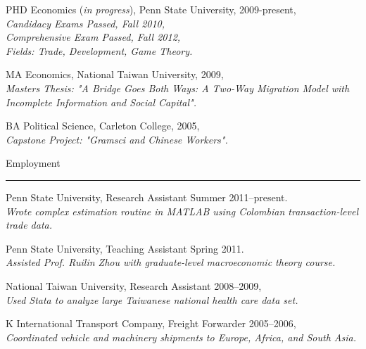 \documentclass[letterpaper]{article}
\renewenvironment{itemize}{
  \begin{list}{}{
    \setlength{\leftmargin}{1.5em}
  }
}{
  \end{list}
}
\begin{document}
\begin{itemize}
  \item PHD Economics (\emph{in progress}), Penn State University, 2009-present,\\
	\hspace*{1cm}\emph{Candidacy Exams Passed, Fall 2010,}\\
  \hspace*{1cm}\emph{Comprehensive Exam Passed, Fall 2012,}\\
	\hspace*{1cm}\emph{Fields: Trade, Development, Game Theory.}
	

  \item MA Economics, National Taiwan University, 2009,\\
	\hspace*{1cm}\emph{Masters Thesis: "A Bridge Goes Both Ways: A Two-Way Migration Model with Incomplete Information \hspace*{1cm}and Social Capital".}

  \item BA Political Science, Carleton College, 2005,\\
	\hspace*{1cm}\emph{Capstone Project: "Gramsci and Chinese Workers".}
\end{itemize}

\vspace{4mm}
{\Large Employment}
 \hrule

\begin{itemize}
\item Penn State University, Research Assistant Summer 2011--present.\\
      \hspace*{1cm}\emph{Wrote complex estimation routine in MATLAB using Colombian transaction-level trade data.}
\item Penn State University, Teaching Assistant Spring 2011.\\
      \hspace*{1cm}\emph{Assisted Prof. Ruilin Zhou with graduate-level macroeconomic theory course.}
\item National Taiwan University, Research Assistant 2008--2009,\\
	\hspace*{1cm}\emph{Used Stata to analyze large Taiwanese national health care data set.}
\item K International Transport Company, Freight Forwarder 2005--2006,\\
	\hspace*{1cm}\emph{Coordinated vehicle and machinery shipments to Europe, Africa, and South Asia.} 
\end{itemize}
\end{document}
